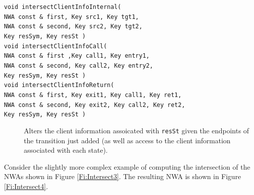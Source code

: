 \begin{description}
  \item[\texttt{void intersectClientInfoInternal( \\ \hspace*{3.25cm}
    NWA const \& first, Key src1, Key tgt1,\\ \hspace*{3.25cm} NWA const \&
    second, Key src2, Key tgt2,\\ \hspace*{3.25cm} Key resSym, Key resSt )}]
    \nopagebreak
  \item[\texttt{void intersectClientInfoCall( \\ \hspace*{3.25cm}
    NWA const \& first ,Key call1, Key entry1,\\ \hspace*{3.25cm}
    NWA const \& second, Key call2, Key entry2,\\ \hspace*{3.25cm} Key
    resSym, Key resSt )}] \nopagebreak
  \item[\texttt{void intersectClientInfoReturn( \\ \hspace*{1.75cm}
    NWA const \& first, Key exit1, Key call1, Key ret1,\\ \hspace*{1.75cm}
    NWA const \& second, Key exit2, Key call2, Key ret2,\\ \hspace*{1.75cm}
    Key resSym, Key resSt )}]

    Alters the client information assoicated with \texttt{resSt} given the
    endpoints of the transition just added (as well as access to the client
    information associated with each state).

\end{description}


Consider the slightly more complex example of computing the intersection of
the NWAs shown in Figure \ref{Fi:Intersect3}.  The resulting NWA is shown in
Figure \ref{Fi:Intersect4}.

